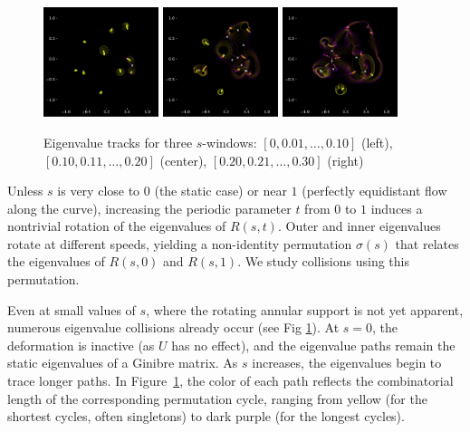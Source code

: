 \documentclass{article}
\begin{document}
	\begin{figure}[htbp]
		\centering
		\includegraphics[width=0.3\textwidth]{figures/N10Circle00to01.pdf}
		\includegraphics[width=0.3\textwidth]{figures/N10Circle01to02.pdf}
		\includegraphics[width=0.3\textwidth]{figures/N10Circle02to03.pdf}
		\caption{Eigenvalue tracks for three $s$-windows: 
		$[0, 0.01, \dots, 0.10]$ (left), 
		$[0.10, 0.11, \dots, 0.20]$ (center), 		
		$[0.20, 0.21, \dots, 0.30]$ (right)}
		\label{fig:3 s-windows}
	\end{figure}

	Unless $s$ is very close to $0$ (the static case) or near $1$ 
	(perfectly equidistant flow along the curve), 
	increasing the periodic parameter $t$ from $0$ to $1$ 
	induces a nontrivial rotation of the eigenvalues of $R(s,t)$. 
	Outer and inner eigenvalues rotate at different speeds, 
	yielding a non-identity permutation $\sigma(s)$ 
	that relates the eigenvalues of $R(s,0)$ and $R(s,1)$. 
	We study collisions using this permutation.

	Even at small values of $s$, where the rotating annular support is not yet apparent, 
	numerous eigenvalue collisions already occur (see Fig \ref{fig:3 s-windows}). 
	At $s = 0$, the deformation is inactive (as $U$ has no effect), 
	and the eigenvalue paths remain the static eigenvalues of a Ginibre matrix. 
	As $s$ increases, the eigenvalues begin to trace longer paths. 
	In Figure~\ref{fig:3 s-windows}, 
	the color of each path reflects the combinatorial length of the corresponding permutation cycle, 
	ranging from yellow (for the shortest cycles, often singletons) to dark purple (for the longest cycles).
\end{document}
